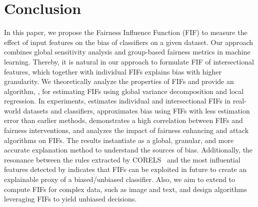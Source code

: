 \section{Conclusion}


In this paper, we propose the Fairness Influence Function (FIF) to measure the effect of input features on the bias of classifiers on a given dataset. Our approach combines global sensitivity analysis and group-based fairness metrics in machine learning. Thereby, it is natural in our approach to formulate FIF of intersectional features, which together with individual FIFs explains bias with higher granularity. We theoretically analyze the properties of FIFs and provide an algorithm, {\fairXplainer}, for estimating FIFs using global variance decomposition and local regression. In experiments, {\fairXplainer} estimates individual and intersectional FIFs in real-world datasets and classifiers, approximates bias using FIFs with less estimation error than earlier methods, demonstrates a high correlation between FIFs and fairness interventions, and analyzes the impact of fairness enhancing and attack algorithms on FIFs. The results instantiate {\fairXplainer} as a global, granular, and more accurate explanation method to understand the sources of bias. Additionally, the resonance between the rules extracted by CORELS~\cite{rudin19} and the most influential features detected by {\fairXplainer} indicates that FIFs can be exploited in future to create an explainable proxy of a biased/unbiased classifier. Also, we aim to extend {\fairXplainer} to compute FIFs for complex data, such as image and text, and design algorithms leveraging FIFs to yield unbiased decisions.
%